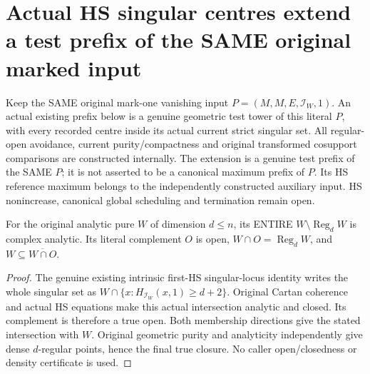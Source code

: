 \section{Actual HS singular centres extend a test prefix of the SAME original marked input}

Keep the SAME original mark-one vanishing input $P=(M,M,E,\mathcal I_W,1)$.
An actual existing prefix below is a genuine geometric test tower of this
literal $P$, with every recorded centre inside its actual current strict
singular set. All regular-open avoidance, current purity/compactness and
original transformed cosupport comparisons are constructed internally.
The extension is a genuine test prefix of the SAME $P$; it is not asserted
to be a canonical maximum prefix of $P$. Its HS reference maximum belongs
to the independently constructed auxiliary input. HS nonincrease, canonical
global scheduling and termination remain open.

\begin{lemma}
\label{hir:actual-pure-current-entire-regular-open}
\leanok
For the original analytic pure $W$ of dimension $d\leq n$, its ENTIRE
$W\setminus\operatorname{Reg}_dW$ is complex analytic. Its literal complement
$O$ is open, $W\cap O=\operatorname{Reg}_dW$, and $W\subseteq\overline{W\cap O}$.
\end{lemma}
\begin{proof}
The genuine existing intrinsic first-HS singular-locus identity writes the
whole singular set as $W\cap\{x:H_{\mathcal I_W}(x,1)\geq d+2\}$. Original
Cartan coherence and actual HS equations make this actual intersection
analytic and closed. Its complement is therefore a true open. Both membership
directions give the stated intersection with $W$. Original geometric purity
and analyticity independently give dense $d$-regular points, hence the final
true closure. No caller open/closedness or density certificate is used.
\end{proof}

